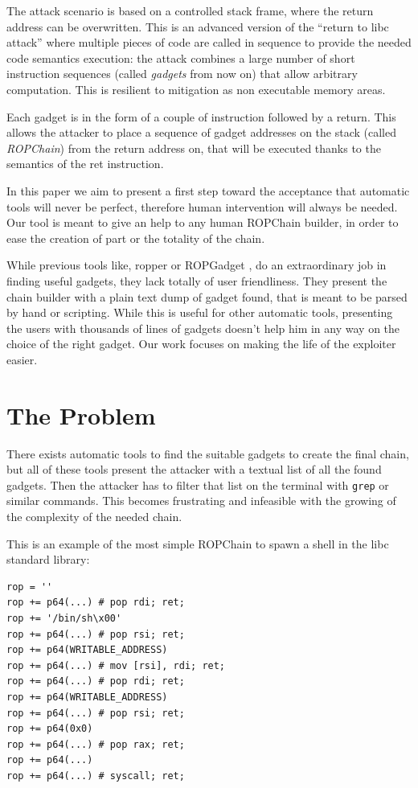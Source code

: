 \documentclass[twocolumn, 11pt]{article}
\begin{document}
The attack scenario is based on a controlled stack frame, where the return address can be overwritten. This is an advanced version of the ``return to libc attack'' \cite{libc} where multiple pieces of code are called in sequence to provide the needed code semantics execution: the attack combines a large number of short instruction sequences (called \textit{gadgets} from now on) that allow arbitrary computation. This is resilient to mitigation as non executable memory areas.

Each gadget is in the form of a couple of instruction followed by a return. This allows the attacker to place a sequence of gadget addresses on the stack (called \textit{ROPChain}) from the return address on, that will be executed thanks to the semantics of the ret instruction.

In this paper we aim to present a first step toward the acceptance that automatic tools will never be perfect, therefore human intervention will always be needed. Our tool is meant to give an help to any human ROPChain builder, in order to ease the creation of part or the totality of the chain.

While previous tools like, ropper \cite{ropper} or ROPGadget \cite{ROPGadget}, do an extraordinary job in finding useful gadgets, they lack totally of user friendliness. They present the chain builder with a plain text dump of gadget found, that is meant to be parsed by hand or scripting. While this is useful for other automatic tools, presenting the users with thousands of lines of gadgets doesn't help him in any way on the choice of the right gadget. Our work focuses on making the life of the exploiter easier.

\section{The Problem}
There exists automatic tools to find the suitable gadgets to create the final chain, but all of these tools present the attacker with a textual list of all the found gadgets. Then the attacker has to filter that list on the terminal with \texttt{grep} or similar commands. This becomes frustrating and infeasible with the growing of the complexity of the needed chain.

This is an example of the most simple ROPChain to spawn a shell in the libc standard library:

\begin{lstlisting}
rop = ''
rop += p64(...) # pop rdi; ret;
rop += '/bin/sh\x00'
rop += p64(...) # pop rsi; ret;
rop += p64(WRITABLE_ADDRESS)
rop += p64(...) # mov [rsi], rdi; ret;
rop += p64(...) # pop rdi; ret;
rop += p64(WRITABLE_ADDRESS)
rop += p64(...) # pop rsi; ret;
rop += p64(0x0)
rop += p64(...) # pop rax; ret;
rop += p64(...)
rop += p64(...) # syscall; ret;
\end{lstlisting}
\end{document}
